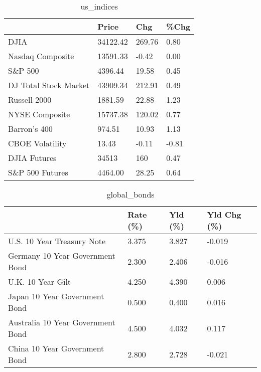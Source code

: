 \documentclass{article}%
\begin{document}
%


\begin{table}[htbp]%
\caption{us\_indices}%
\centering%
\begin{adjustbox}{width=1\textwidth}%
\begin{tabular}{llll}
\toprule
                      &    Price &    Chg &  \%Chg \\
\midrule
                 DJIA & 34122.42 & 269.76 &  0.80 \\
     Nasdaq Composite & 13591.33 &  -0.42 &  0.00 \\
              S\&P 500 &  4396.44 &  19.58 &  0.45 \\
DJ Total Stock Market & 43909.34 & 212.91 &  0.49 \\
         Russell 2000 &  1881.59 &  22.88 &  1.23 \\
       NYSE Composite & 15737.38 & 120.02 &  0.77 \\
         Barron's 400 &   974.51 &  10.93 &  1.13 \\
      CBOE Volatility &    13.43 &  -0.11 & -0.81 \\
         DJIA Futures &    34513 &    160 &  0.47 \\
      S\&P 500 Futures &  4464.00 &  28.25 &  0.64 \\
\bottomrule
\end{tabular}
%
\end{adjustbox}%
\end{table}

%


\begin{table}[htbp]%
\caption{global\_bonds}%
\centering%
\begin{adjustbox}{width=1\textwidth}%
\begin{tabular}{llll}
\toprule
                                  & Rate (\%) & Yld (\%) & Yld Chg (\%) \\
\midrule
       U.S. 10 Year Treasury Note &    3.375 &   3.827 &      -0.019 \\
  Germany 10 Year Government Bond &    2.300 &   2.406 &      -0.016 \\
                U.K. 10 Year Gilt &    4.250 &   4.390 &       0.006 \\
    Japan 10 Year Government Bond &    0.500 &   0.400 &       0.016 \\
Australia 10 Year Government Bond &    4.500 &   4.032 &       0.117 \\
    China 10 Year Government Bond &    2.800 &   2.728 &      -0.021 \\
\bottomrule
\end{tabular}
%
\end{adjustbox}%
\end{table}
\end{document}
